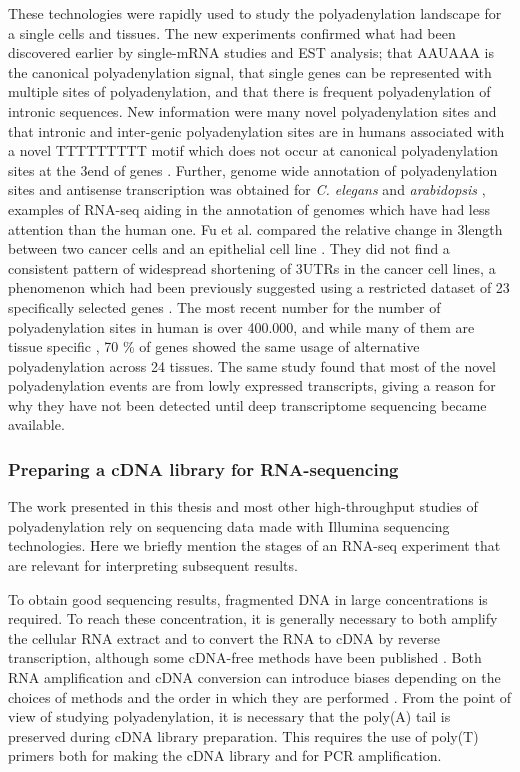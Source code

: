 These technologies were rapidly used to study the polyadenylation landscape for
a single cells and tissues. The new experiments confirmed what had been
discovered earlier by single-mRNA studies and EST analysis; that AAUAAA is the
canonical polyadenylation signal, that single genes can be represented with
multiple sites of polyadenylation, and that there is frequent polyadenylation
of intronic sequences. New information were many novel polyadenylation sites
and that intronic and inter-genic polyadenylation sites are in humans
associated with a novel TTTTTTTTT motif which does not occur at canonical
polyadenylation sites at the 3\p end of genes
\cite{ozsolak_comprehensive_2010}. Further, genome wide annotation of
polyadenylation sites and antisense transcription was obtained for \textit{C.
elegans} and \textit{arabidopsis} \cite{mangone_landscape_2010,
wu_genome-wide_2011}, examples of RNA-seq aiding in the annotation of genomes
which have had less attention than the human one. Fu et al. compared the
relative change in 3\p length between two cancer cells and an epithelial cell
line \cite{fu_differential_2011}. They did not find a consistent pattern of
widespread shortening of 3\p UTRs in the cancer cell lines, a phenomenon which
had been previously suggested using a restricted dataset of 23 specifically
selected genes \cite{mayr_widespread_2009-2}. The most recent number for the
number of polyadenylation sites in human is over 400.000, and while many of
them are tissue specific \cite{derti_quantitative_2012}, 70
\% of genes showed the same usage of alternative polyadenylation across 24
tissues. The same study found that most of the novel polyadenylation events are
from lowly expressed transcripts, giving a reason for why they have not been
detected until deep transcriptome sequencing became available. 

\subsubsection{Preparing a cDNA library for RNA-sequencing}
The work presented in this thesis and most other high-throughput studies of
polyadenylation rely on sequencing data made with Illumina sequencing
technologies. Here we briefly mention the stages of an RNA-seq
experiment that are relevant for interpreting subsequent results.

To obtain good sequencing results, fragmented DNA in large concentrations is
required. To reach these concentration, it is generally necessary to both
amplify the cellular RNA extract and to convert the RNA to cDNA by reverse
transcription, although some cDNA-free methods have been published
\cite{ozsolak_comprehensive_2010}. Both RNA amplification and cDNA conversion
can introduce biases depending on the choices of methods and the order in which
they are performed \cite{wang_rna-seq:_2009}. From the point of view of
studying polyadenylation, it is necessary that the poly(A) tail is preserved
during cDNA library preparation. This requires the use of poly(T) primers both
for making the cDNA library and for PCR amplification.

